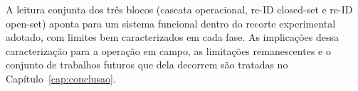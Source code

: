 A leitura conjunta dos três blocos (cascata operacional, re-ID closed-set e re-ID open-set) aponta para um sistema funcional dentro do recorte experimental adotado, com limites bem caracterizados em cada fase. As implicações dessa caracterização para a operação em campo, as limitações remanescentes e o conjunto de trabalhos futuros que dela decorrem são tratadas no Capítulo~\ref{cap:conclusao}.
